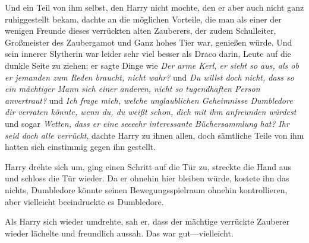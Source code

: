 Und ein Teil von ihm selbst, den Harry nicht mochte, den er aber auch nicht ganz ruhiggestellt bekam, dachte an die möglichen Vorteile, die man als einer der wenigen Freunde dieses verrückten alten Zauberers, der zudem Schulleiter, Großmeister des Zaubergamot und Ganz hohes Tier war, genießen würde. Und sein innerer Slytherin war leider sehr viel besser als Draco darin, Leute auf die dunkle Seite zu ziehen; er sagte Dinge wie \emph{Der arme Kerl, er sieht so aus, als ob er jemanden zum Reden braucht, nicht wahr?} und \emph{Du willst doch nicht, dass so ein mächtiger Mann sich einer anderen, nicht so tugendhaften Person anvertraut?} und \emph{Ich frage mich, welche unglaublichen Geheimnisse Dumbledore dir verraten könnte, wenn du, du weißt schon, dich mit ihm anfreunden würdest} und sogar \emph{Wetten, dass er eine seeeehr interessante Büchersammlung hat?}
\emph{Ihr seid doch alle verrückt}, dachte Harry zu ihnen allen, doch sämtliche Teile von ihm hatten sich einstimmig gegen ihn gestellt.

Harry drehte sich um, ging einen Schritt auf die Tür zu, streckte die Hand aus und schloss die Tür wieder. Da er ohnehin hier bleiben würde, kostete ihn das nichts, Dumbledore könnte seinen Bewegungsspielraum ohnehin kontrollieren, aber vielleicht beeindruckte es Dumbledore.

Als Harry sich wieder umdrehte, sah er, dass der mächtige verrückte Zauberer wieder lächelte und freundlich aussah. Das war gut—vielleicht.

